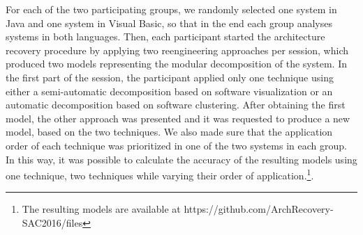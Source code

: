 {




For each of the two participating groups, we randomly selected one system in Java and one system in Visual Basic, so that in the end each group analyses systems in both languages. Then, each participant started the architecture recovery procedure by applying two reengineering approaches per session, which produced two models representing the modular decomposition of the system. In the first part of the session, the participant applied only one technique using either a semi-automatic decomposition based on software visualization or an automatic decomposition based on software clustering. After obtaining the first model, the other approach was presented and it was requested to produce a new model, based on the two techniques. We also made sure that the application order of each technique was prioritized in one of the two systems in each group. In this way, it was possible to calculate the accuracy of the resulting models using one technique, two techniques while varying their order of application.\footnote{The resulting models are available at https://github.com/ArchRecovery-SAC2016/files}.

}
